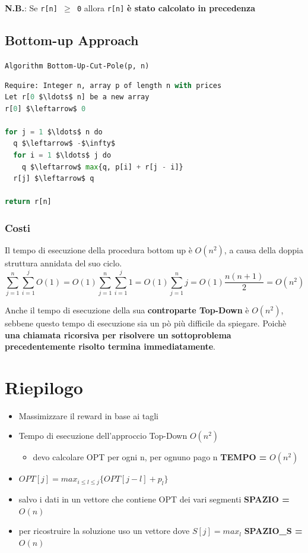 \textbf{N.B.}: Se \texttt{r{[}n{]}\ $\geq$\ 0} allora \texttt{r{[}n{]}}
\textbf{è stato calcolato in precedenza}

\subsection{Bottom-up Approach}

\texttt{Algorithm Bottom-Up-Cut-Pole(p, n)}
\begin{lstlisting}[language=Python, mathescape=true]
Require: Integer n, array p of length n with prices
Let r[0 $\ldots$ n] be a new array
r[0] $\leftarrow$ 0

for j = 1 $\ldots$ n do
  q $\leftarrow$ -$\infty$
  for i = 1 $\ldots$ j do
    q $\leftarrow$ max{q, p[i] + r[j - i]}
  r[j] $\leftarrow$ q

return r[n]
\end{lstlisting}

\subsubsection{Costi}

Il tempo di esecuzione della procedura bottom up è $O(n^2)$, a causa
della doppia struttura annidata del suo ciclo.
$$
  \sum^n_{j=1} \sum^j_{i=1} O(1) = O(1) \sum^n_{j=1} \sum^j_{i=1} 1 = O(1) \sum^n_{j=1} j = O(1) \frac{n(n+1)}{2} = O(n^2)
$$

Anche il tempo di esecuzione della sua \textbf{controparte Top-Down} è
$O(n^2)$, sebbene questo tempo di esecuzione sia un pò più difficile
da spiegare. Poichè \textbf{una chiamata ricorsiva per risolvere un
  sottoproblema precedentemente risolto termina immediatamente}.

\section{Riepilogo}

\begin{itemize}
  \item
        Massimizzare il reward in base ai tagli
  \item
        Tempo di esecuzione dell'approccio Top-Down $O(n^2)$

        \begin{itemize}
          \item
                devo calcolare OPT per ogni n, per ognuno pago n \textbf{TEMPO =}
                $O(n^2)$
        \end{itemize}
  \item
        $OPT[j] = max_{i \le l \le j} \{ OPT[j-l] + p_l \}$
  \item
        salvo i dati in un vettore che contiene OPT dei vari segmenti
        \textbf{SPAZIO =} $O(n)$
  \item
        per ricostruire la soluzione uso un vettore dove $S[j] = max_l$
        \textbf{SPAZIO\_S =} $O(n)$
\end{itemize}
